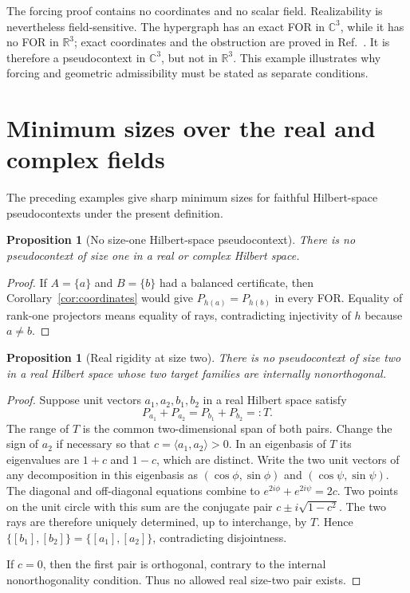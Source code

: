 \documentclass[
  twocolumn,
  aps,
  pra,
  floatfix,
  amsmath,amssymb,
  longbibliography
]{revtex4-2}
\newtheorem{proposition}[theorem]{Proposition}
\theoremstyle{definition}
\theoremstyle{remark}
\newcommand{\R}{\mathbb R}
\newcommand{\C}{\mathbb C}
\begin{document}
The forcing proof contains no coordinates and no scalar field.  Realizability
is nevertheless field-sensitive.  The hypergraph has an exact FOR in
$\C^3$, while it has no FOR in
$\R^3$; exact coordinates and the obstruction are proved in
Ref.~\cite{2026-Navara-Svozil-complex-only-3d-hypergraphs}.  It is therefore a
pseudocontext in $\C^3$, but not in $\R^3$.  This example illustrates why
forcing and geometric admissibility must be stated as separate conditions.

\section{Minimum sizes over the real and complex fields}
\label{sec:minimal}

The preceding examples give sharp minimum sizes for faithful Hilbert-space
pseudocontexts under the present definition.

\begin{proposition}[No size-one Hilbert-space pseudocontext]
\label{prop:no-k1}
There is no pseudocontext of size one in a real or complex Hilbert space.
\end{proposition}

\begin{proof}
If $A=\{a\}$ and $B=\{b\}$ had a balanced certificate, then
Corollary~\ref{cor:coordinates} would give $P_{h(a)}=P_{h(b)}$ in every
FOR.  Equality of rank-one projectors means equality of
rays, contradicting injectivity of $h$ because $a\ne b$.
\end{proof}

\begin{proposition}[Real rigidity at size two]
\label{prop:real-k2}
There is no pseudocontext of size two in a real Hilbert space whose two target
families are internally nonorthogonal.
\end{proposition}

\begin{proof}
Suppose unit vectors $a_1,a_2,b_1,b_2$ in a real Hilbert space satisfy
\[
 P_{a_1}+P_{a_2}=P_{b_1}+P_{b_2}=:T.
\]
The range of $T$ is the common two-dimensional span of both pairs.  Change
the sign of $a_2$ if necessary so that
$c=\langle a_1,a_2\rangle>0$.  In an eigenbasis of $T$ its eigenvalues are
$1+c$ and $1-c$, which are distinct.  Write the two unit vectors of any
decomposition in this eigenbasis as
$(\cos\phi,\sin\phi)$ and $(\cos\psi,\sin\psi)$.  The diagonal and
off-diagonal equations combine to
$e^{2i\phi}+e^{2i\psi}=2c$.  Two points on the unit circle with this sum are
the conjugate pair $c\pm i\sqrt{1-c^2}$.  The two rays are therefore uniquely
determined, up to interchange, by $T$.  Hence
$\{[b_1],[b_2]\}=\{[a_1],[a_2]\}$, contradicting disjointness.

If $c=0$, then the first pair is orthogonal, contrary to the internal
nonorthogonality condition.  Thus no allowed real size-two pair exists.
\end{proof}
\end{document}
